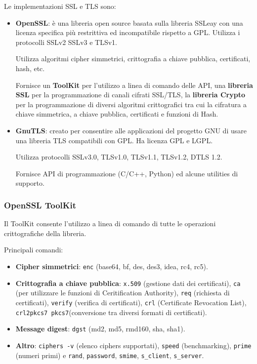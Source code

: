             Le implementazioni SSL e TLS sono:
            \begin{itemize}
                \item \textbf{OpenSSL}: è una libreria open source basata sulla libreria SSLeay con una licenza specifica più restrittiva ed incompatibile rispetto a GPL. Utilizza i protocolli SSLv2 SSLv3 e TLSv1.
                
                Utilizza algoritmi cipher simmetrici, crittografia a chiave pubblica, certificati, hash, etc.
                
                Fornisce un \textbf{ToolKit} per l'utilizzo a linea di comando delle API, una \textbf{libreria SSL} per la programmazione di canali cifrati SSL/TLS, la \textbf{libreria Crypto} per la programmazione di diversi algoritmi crittografici tra cui la cifratura a chiave simmetrica, a chiave pubblica, certificati e funzioni di Hash.
                \item \textbf{GnuTLS}: creato per consentire alle applicazioni del progetto GNU di usare una libreria TLS compatibili con GPL. Ha licenza GPL e LGPL.
                
                Utilizza protocolli SSLv3.0, TLSv1.0, TLSv1.1, TLSv1.2, DTLS 1.2.

                Fornisce API di programmazione (C/C++, Python) ed alcune utilities di supporto.
            \end{itemize}

        \subsubsection{OpenSSL ToolKit}
            Il ToolKit consente l'utilizzo a linea di comando di tutte le operazioni crittografiche della libreria.

            Principali comandi:
            \begin{itemize}
                \item \textbf{Cipher simmetrici}: \verb|enc| (base64, bf, des, des3, idea, rc4, rc5).
                \item \textbf{Crittografia a chiave pubblica}: \verb|x.509| (gestione dati dei certificati), \verb|ca| (per utilizzare le funzioni di Ceritification Authority), \verb|req| (richiesta di certificati), \verb|verify| (verifica di certificati), \verb|crl| (Certificate Revocation List), \verb|crl2pkcs7 pkcs7|(conversione tra diversi formati di certificati).
                \item \textbf{Message digest}: \verb|dgst| (md2, md5, rmd160, sha, sha1).
                \item \textbf{Altro}: \verb|ciphers -v| (elenco ciphers supportati), \verb|speed| (benchmarking), \verb|prime| (numeri primi) e \verb|rand|, \verb|password|, \verb|smime|, \verb|s_client|, \verb|s_server|.
            \end{itemize}
            
